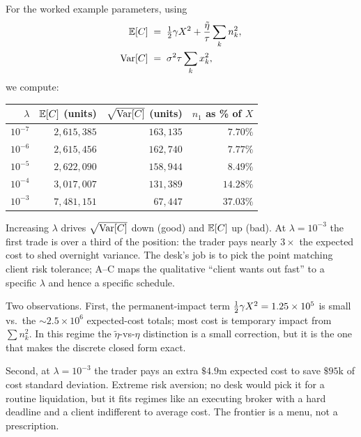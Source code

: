 For the worked example parameters, using
\begin{align*}
  \mathbb{E}[C]   &\;=\; \tfrac{1}{2}\gamma X^2 + \frac{\tilde\eta}{\tau}\sum_k n_k^2, \\
  \operatorname{Var}[C] &\;=\; \sigma^2\tau\sum_k x_k^2,
\end{align*}
we compute:

\begin{center}
\begin{tabular}{rrrr}\toprule
  $\lambda$ & $\mathbb{E}[C]$ (units) & $\sqrt{\operatorname{Var}[C]}$ (units) & $n_1$ as \% of $X$ \\ \midrule
  $10^{-7}$ & $2{,}615{,}385$ & $163{,}135$ & $7.70\%$ \\
  $10^{-6}$ & $2{,}615{,}456$ & $162{,}740$ & $7.77\%$ \\
  $10^{-5}$ & $2{,}622{,}090$ & $158{,}944$ & $8.49\%$ \\
  $10^{-4}$ & $3{,}017{,}007$ & $131{,}389$ & $14.28\%$ \\
  $10^{-3}$ & $7{,}481{,}151$ & $67{,}447$  & $37.03\%$ \\ \bottomrule
\end{tabular}
\end{center}

Increasing $\lambda$ drives $\sqrt{\operatorname{Var}[C]}$ down (good) and
$\mathbb{E}[C]$ up (bad). At $\lambda = 10^{-3}$ the first trade is over
a third of the position: the trader pays nearly $3\times$ the
expected cost to shed overnight variance. The desk's job is to
pick the point matching client risk tolerance; A--C maps the
qualitative ``client wants out fast'' to a specific $\lambda$ and
hence a specific schedule.

\begin{intuitionbox}
Two observations. First, the permanent-impact term
$\tfrac{1}{2}\gamma X^2 = 1.25\times 10^5$ is small vs.\ the
$\sim 2.5\times 10^6$ expected-cost totals; most cost is temporary
impact from $\sum n_k^2$. In this regime the $\tilde\eta$-vs-$\eta$
distinction is a small correction, but it is the one that makes the
discrete closed form exact.

Second, at $\lambda = 10^{-3}$ the trader pays an extra $\$4.9$m
expected cost to save $\$95$k of cost standard deviation.
Extreme risk aversion; no desk would pick it for a routine
liquidation, but it fits regimes like an executing broker with a
hard deadline and a client indifferent to average cost. The
frontier is a menu, not a prescription.
\end{intuitionbox}

